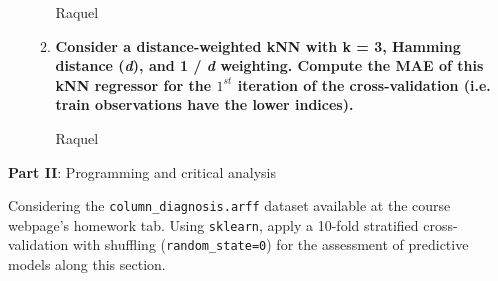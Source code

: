 \documentclass[12pt]{article}
\begin{document}
\begin{enumerate}[leftmargin=\labelsep]
\begin{enumerate}
          \vskip 0.3cm
          Raquel

    \item \textbf{Consider a distance-weighted kNN with k = 3, Hamming distance (\textit{d}), and 1 / \textit{d} weighting.
          Compute the MAE of this kNN regressor for the $1^{st}$ iteration of the cross-validation (i.e. train
          observations have the lower indices).}

          \vskip 0.3cm
          Raquel
          \end{enumerate}
\end{enumerate}

\vskip 0.5cm

\begin{center}
\large{\textbf{Part II}: Programming and critical analysis}\normalsize
\end{center}

\noindent Considering the \texttt{column\_diagnosis.arff} dataset available at the course webpage’s homework tab. Using \texttt{sklearn}, apply a 10-fold stratified
cross-validation with shuffling (\texttt{random\_state=0}) for the assessment of predictive models along this section.
\end{document}
